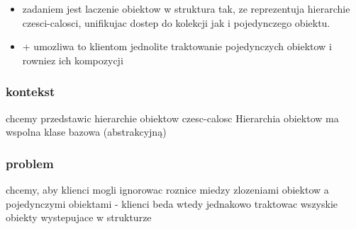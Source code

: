\documentclass[11pt]{article}
\begin{document}
\begin{itemize}
\item zadaniem jest laczenie obiektow w struktura tak, ze reprezentuja hierarchie czesci-calosci, unifikujac dostep do kolekcji jak i pojedynczego obiektu.
\item + umozliwa to klientom jednolite traktowanie pojedynczych obiektow i rowniez ich kompozycji
\end{itemize}

\subsubsection{kontekst}
\label{sec:org927fe0d}
chcemy przedstawic hierarchie obiektow czesc-calosc Hierarchia obiektow ma wspolna klase bazowa (abstrakcyjną)
\subsubsection{problem}
\label{sec:org9375bc7}
chcemy, aby klienci mogli ignorowac roznice miedzy zlozeniami obiektow a pojedynczymi obiektami - klienci beda wtedy jednakowo traktowac wszyskie obiekty wystepujace w strukturze
\end{document}
